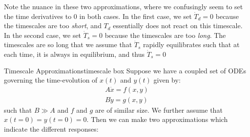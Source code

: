 Note the nuance in these two approximations, where we confusingly seem to set the time derivatives to $0$ in both cases. In the first case, we set $\dot T_d=0$ because the timescales are too \textit{short}, and $T_d$ essentially does not react on this timescale. In the second case, we set $\dot T_s=0$ because the timescales are too \textit{long}. The timescales are so long that we assume that $\dot T_s$ rapidly equilibrates such that at each time, it is always in equilibrium, and thus $\dot T_s=0$

\begin{fact}{Timescale Approximations}{timescale box}\label{timescale box}
    Suppose we have a coupled set of ODEs governing the time-evolution of $x(t)$ and $y(t)$ given by:
    \begin{align*}
        A \dot{x}=f(x,y)\\
        B \dot{y} = g(x,y)
    \end{align*}
    such that $B\gg A$ and $f$ and $g$ are of similar size. We further assume that $x(t=0)=y(t=0)=0$. Then we can make two approximations which indicate the different responses:


\end{fact}
